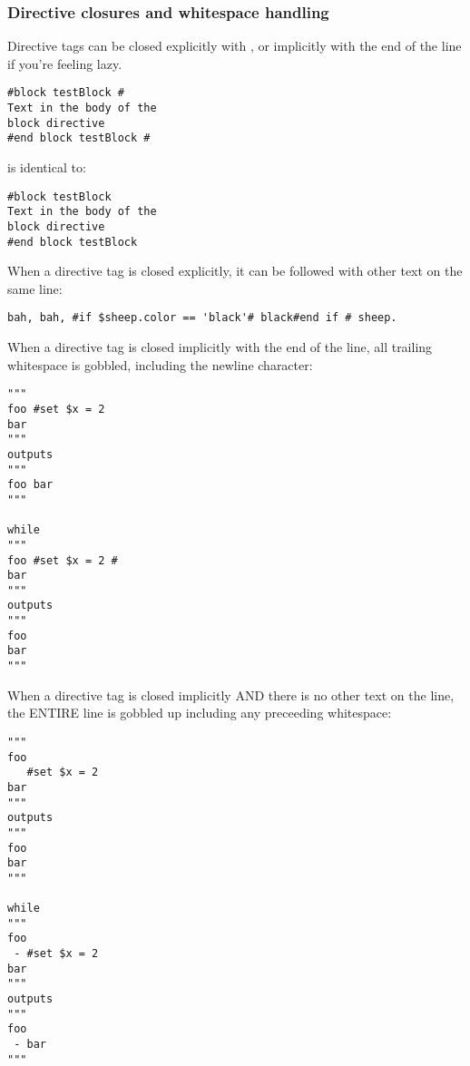 %

\subsubsection{Directive closures and whitespace handling}
\label{language.directives.closures}
Directive tags can be closed explicitly with \code{\#}, or implicitly with the
end of the line if you're feeling lazy.

\begin{verbatim}
#block testBlock #
Text in the body of the
block directive
#end block testBlock #
\end{verbatim}
is identical to:
\begin{verbatim}
#block testBlock
Text in the body of the
block directive
#end block testBlock
\end{verbatim}

When a directive tag is closed explicitly, it can be followed with other text on
the same line:

\begin{verbatim}
bah, bah, #if $sheep.color == 'black'# black#end if # sheep.
\end{verbatim}

When a directive tag is closed implicitly with the end of the line, all trailing
whitespace is gobbled, including the newline character:
\begin{verbatim}
"""
foo #set $x = 2 
bar
"""
outputs 
"""
foo bar
"""

while 
"""
foo #set $x = 2 #
bar
"""
outputs 
"""
foo 
bar
"""
\end{verbatim}

When a directive tag is closed implicitly AND there is no other text on the
line, the ENTIRE line is gobbled up including any preceeding whitespace:
\begin{verbatim}
"""
foo 
   #set $x = 2 
bar
"""
outputs 
"""
foo
bar
"""

while 
"""
foo 
 - #set $x = 2
bar
"""
outputs 
"""
foo 
 - bar
"""
\end{verbatim}

